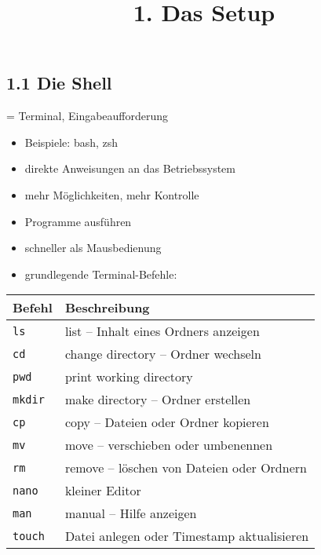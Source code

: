 \documentclass[
  11pt,
  a4paper,
  DIV=11,
  numbers=noendperiod]{scrartcl}
\title{1. Das Setup}
\author{}
\date{}
\providecommand{\tightlist}{%
  \setlength{\itemsep}{0pt}\setlength{\parskip}{0pt}}\usepackage{longtable,booktabs,array}
\begin{document}
\maketitle


\subsection{1.1 Die Shell}\label{die-shell}

= Terminal, Eingabeaufforderung

\begin{itemize}
\tightlist
\item
  Beispiele: bash, zsh
\item
  direkte Anweisungen an das Betriebssystem
\item
  mehr Möglichkeiten, mehr Kontrolle
\item
  Programme ausführen
\item
  schneller als Mausbedienung
\item
  grundlegende Terminal-Befehle:
\end{itemize}

\begin{longtable}[]{@{}
  >{\raggedright\arraybackslash}p{}
  >{\raggedright\arraybackslash}p{}@{}}
\toprule\noalign{}
\begin{minipage}[b]{\linewidth}\raggedright
Befehl
\end{minipage} & \begin{minipage}[b]{\linewidth}\raggedright
Beschreibung
\end{minipage} \\
\midrule\noalign{}
\endhead
\bottomrule\noalign{}
\endlastfoot
\texttt{ls} & list -- Inhalt eines Ordners anzeigen \\
\texttt{cd} & change directory -- Ordner wechseln \\
\texttt{pwd} & print working directory \\
\texttt{mkdir} & make directory -- Ordner erstellen \\
\texttt{cp} & copy -- Dateien oder Ordner kopieren \\
\texttt{mv} & move -- verschieben oder umbenennen \\
\texttt{rm} & remove -- löschen von Dateien oder Ordnern \\
\texttt{nano} & kleiner Editor \\
\texttt{man} & manual -- Hilfe anzeigen \\
\texttt{touch} & Datei anlegen oder Timestamp aktualisieren \\
\end{longtable}
\end{document}
